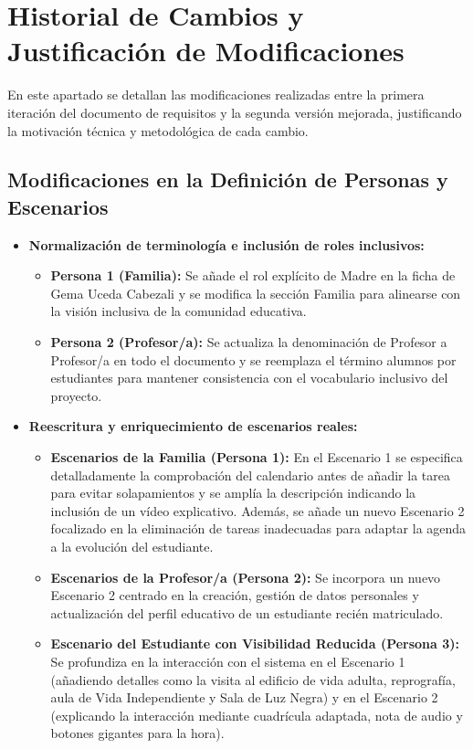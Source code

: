 \section{Historial de Cambios y Justificación de Modificaciones}En este apartado se detallan las modificaciones realizadas entre la primera iteración del documento de requisitos y la segunda versión mejorada, justificando la motivación técnica y metodológica de cada cambio.\subsection{Modificaciones en la Definición de Personas y Escenarios}
\begin{itemize}
\item \textbf{Normalización de terminología e inclusión de roles inclusivos:}
\begin{itemize}
\item \textbf{Persona 1 (Familia):} Se añade el rol explícito de Madre en la ficha de Gema Uceda Cabezali y se modifica la sección Familia para alinearse con la visión inclusiva de la comunidad educativa.
\item \textbf{Persona 2 (Profesor/a):} Se actualiza la denominación de Profesor a Profesor/a en todo el documento y se reemplaza el término alumnos por estudiantes para mantener consistencia con el vocabulario inclusivo del proyecto.
\end{itemize}\item \textbf{Reescritura y enriquecimiento de escenarios reales:}
\begin{itemize}
    \item \textbf{Escenarios de la Familia (Persona 1):} En el Escenario 1 se especifica detalladamente la comprobación del calendario antes de añadir la tarea para evitar solapamientos y se amplía la descripción indicando la inclusión de un vídeo explicativo. Además, se añade un nuevo Escenario 2 focalizado en la eliminación de tareas inadecuadas para adaptar la agenda a la evolución del estudiante.
    \item \textbf{Escenarios de la Profesor/a (Persona 2):} Se incorpora un nuevo Escenario 2 centrado en la creación, gestión de datos personales y actualización del perfil educativo de un estudiante recién matriculado.
    \item \textbf{Escenario del Estudiante con Visibilidad Reducida (Persona 3):} Se profundiza en la interacción con el sistema en el Escenario 1 (añadiendo detalles como la visita al edificio de vida adulta, reprografía, aula de Vida Independiente y Sala de Luz Negra) y en el Escenario 2 (explicando la interacción mediante cuadrícula adaptada, nota de audio y botones gigantes para la hora).

\end{itemize}
\end{itemize}
